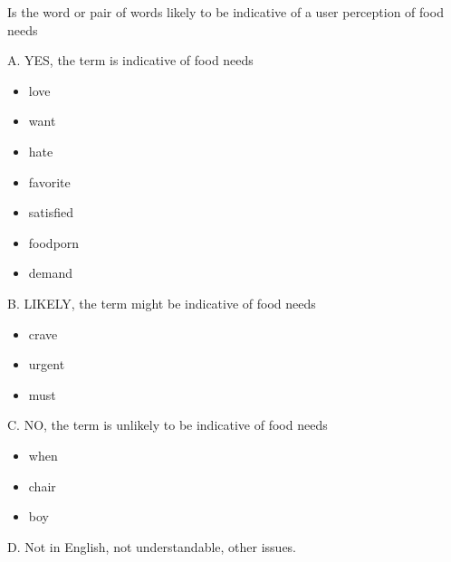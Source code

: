 Is the word or pair of words likely to be indicative of a user perception of food needs

A. YES, the term is indicative of food needs

\begin{itemize}
  \item love
  \item want
  \item hate
  \item favorite 
  \item satisfied
  \item foodporn
  \item demand


\end{itemize}

B. LIKELY, the term might be indicative of food needs
\begin{itemize}
  \item crave
  \item urgent
  \item must
\end{itemize}

C. NO, the term is unlikely to be indicative of food needs 
\begin{itemize}
  \item when
  \item chair
  \item boy
\end{itemize}

D. Not in English, not understandable, other issues.

